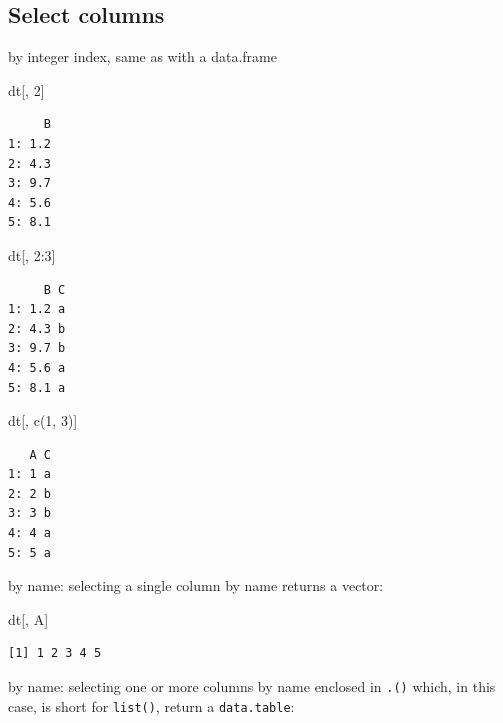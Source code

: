 \documentclass[
]{book}
\newenvironment{Shaded}{\begin{snugshade}}{\end{snugshade}}
\newcommand{\DecValTok}[1]{\textcolor[rgb]{0.00,0.00,0.81}{#1}}
\newcommand{\FunctionTok}[1]{\textcolor[rgb]{0.00,0.00,0.00}{#1}}
\newcommand{\NormalTok}[1]{#1}
\newcommand{\SpecialCharTok}[1]{\textcolor[rgb]{0.00,0.00,0.00}{#1}}
\begin{document}
\hypertarget{select-columns}{%
\subsection{Select columns}\label{select-columns}}

by integer index, same as with a data.frame

\begin{Shaded}
\begin{Highlighting}[]
\NormalTok{dt[, }\DecValTok{2}\NormalTok{]}
\end{Highlighting}
\end{Shaded}

\begin{verbatim}
     B
1: 1.2
2: 4.3
3: 9.7
4: 5.6
5: 8.1
\end{verbatim}

\begin{Shaded}
\begin{Highlighting}[]
\NormalTok{dt[, }\DecValTok{2}\SpecialCharTok{:}\DecValTok{3}\NormalTok{]}
\end{Highlighting}
\end{Shaded}

\begin{verbatim}
     B C
1: 1.2 a
2: 4.3 b
3: 9.7 b
4: 5.6 a
5: 8.1 a
\end{verbatim}

\begin{Shaded}
\begin{Highlighting}[]
\NormalTok{dt[, }\FunctionTok{c}\NormalTok{(}\DecValTok{1}\NormalTok{, }\DecValTok{3}\NormalTok{)]}
\end{Highlighting}
\end{Shaded}

\begin{verbatim}
   A C
1: 1 a
2: 2 b
3: 3 b
4: 4 a
5: 5 a
\end{verbatim}

by name: selecting a single column by name returns a vector:

\begin{Shaded}
\begin{Highlighting}[]
\NormalTok{dt[, A]}
\end{Highlighting}
\end{Shaded}

\begin{verbatim}
[1] 1 2 3 4 5
\end{verbatim}

by name: selecting one or more columns by name enclosed in \texttt{.()} which, in this case, is short for \texttt{list()}, return a \texttt{data.table}:
\end{document}
